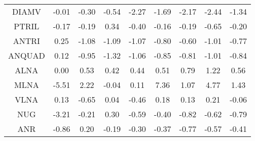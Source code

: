 \documentclass[11pt,a4paper]{report}
\begin{document}
\begin{longtable}{ | c || c | c | c | c | c | c | c || c |}
DIAMV &  \cellcolor[HTML]{FFFFFF} -0.01 &  \cellcolor[HTML]{FFF7F7} -0.30 &  \cellcolor[HTML]{FFEFEF} -0.54 &  \cellcolor[HTML]{FFC7C7} -2.27 &  \cellcolor[HTML]{FFD7D7} -1.69 &  \cellcolor[HTML]{FFC7C7} -2.17 &  \cellcolor[HTML]{FFBFBF} -2.44 &  \cellcolor[HTML]{FFDFDF} -1.34 \\
PTRIL &  \cellcolor[HTML]{FFF7F7} -0.17 &  \cellcolor[HTML]{FFF7F7} -0.19 &  \cellcolor[HTML]{F7F7FF} 0.34 &  \cellcolor[HTML]{FFF7F7} -0.40 &  \cellcolor[HTML]{FFFFFF} -0.16 &  \cellcolor[HTML]{FFF7F7} -0.19 &  \cellcolor[HTML]{FFEFEF} -0.65 &  \cellcolor[HTML]{FFF7F7} -0.20 \\
ANTRI &  \cellcolor[HTML]{F7F7FF} 0.25 &  \cellcolor[HTML]{FFE7E7} -1.08 &  \cellcolor[HTML]{FFE7E7} -1.09 &  \cellcolor[HTML]{FFE7E7} -1.07 &  \cellcolor[HTML]{FFE7E7} -0.80 &  \cellcolor[HTML]{FFEFEF} -0.60 &  \cellcolor[HTML]{FFE7E7} -1.01 &  \cellcolor[HTML]{FFEFEF} -0.77 \\
ANQUAD &  \cellcolor[HTML]{FFFFFF} 0.12 &  \cellcolor[HTML]{FFE7E7} -0.95 &  \cellcolor[HTML]{FFDFDF} -1.32 &  \cellcolor[HTML]{FFE7E7} -1.06 &  \cellcolor[HTML]{FFE7E7} -0.85 &  \cellcolor[HTML]{FFE7E7} -0.81 &  \cellcolor[HTML]{FFE7E7} -1.01 &  \cellcolor[HTML]{FFE7E7} -0.84 \\
ALNA &  \cellcolor[HTML]{FFFFFF} 0.00 &  \cellcolor[HTML]{EFEFFF} 0.53 &  \cellcolor[HTML]{F7F7FF} 0.42 &  \cellcolor[HTML]{F7F7FF} 0.44 &  \cellcolor[HTML]{EFEFFF} 0.51 &  \cellcolor[HTML]{E7E7FF} 0.79 &  \cellcolor[HTML]{DFDFFF} 1.22 &  \cellcolor[HTML]{EFEFFF} 0.56 \\
MLNA &  \cellcolor[HTML]{FF7878} -5.51 &  \cellcolor[HTML]{C7C7FF} 2.22 &  \cellcolor[HTML]{FFFFFF} -0.04 &  \cellcolor[HTML]{FFFFFF} 0.11 &  \cellcolor[HTML]{4848FF} 7.36 &  \cellcolor[HTML]{E7E7FF} 1.07 &  \cellcolor[HTML]{8787FF} 4.77 &  \cellcolor[HTML]{DFDFFF} 1.43 \\
VLNA &  \cellcolor[HTML]{FFFFFF} 0.13 &  \cellcolor[HTML]{FFEFEF} -0.65 &  \cellcolor[HTML]{FFFFFF} 0.04 &  \cellcolor[HTML]{FFF7F7} -0.46 &  \cellcolor[HTML]{F7F7FF} 0.18 &  \cellcolor[HTML]{FFFFFF} 0.13 &  \cellcolor[HTML]{F7F7FF} 0.21 &  \cellcolor[HTML]{FFFFFF} -0.06 \\
NUG &  \cellcolor[HTML]{FFAFAF} -3.21 &  \cellcolor[HTML]{FFF7F7} -0.21 &  \cellcolor[HTML]{F7F7FF} 0.30 &  \cellcolor[HTML]{FFEFEF} -0.59 &  \cellcolor[HTML]{FFF7F7} -0.40 &  \cellcolor[HTML]{FFE7E7} -0.82 &  \cellcolor[HTML]{FFEFEF} -0.62 &  \cellcolor[HTML]{FFE7E7} -0.79 \\
ANR &  \cellcolor[HTML]{FFE7E7} -0.86 &  \cellcolor[HTML]{F7F7FF} 0.20 &  \cellcolor[HTML]{FFF7F7} -0.19 &  \cellcolor[HTML]{FFF7F7} -0.30 &  \cellcolor[HTML]{FFF7F7} -0.37 &  \cellcolor[HTML]{FFEFEF} -0.77 &  \cellcolor[HTML]{FFEFEF} -0.57 &  \cellcolor[HTML]{FFF7F7} -0.41 \\

\end{longtable}
\end{document}

